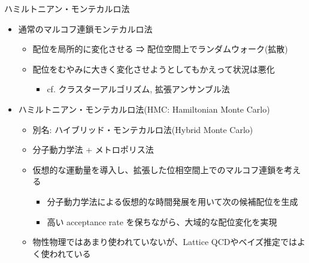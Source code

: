 
\begin{frame}[t,fragile]{ハミルトニアン・モンテカルロ法}
  \begin{itemize}
  \item 通常のマルコフ連鎖モンテカルロ法
  \begin{itemize}
    \item 配位を局所的に変化させる ⇒ 配位空間上でランダムウォーク(拡散)
    \item 配位をむやみに大きく変化させようとしてもかえって状況は悪化
    \begin{itemize}
      \item cf. クラスターアルゴリズム, 拡張アンサンブル法
    \end{itemize}
  \end{itemize}

  \item ハミルトニアン・モンテカルロ法(HMC: Hamiltonian Monte Carlo)
  \begin{itemize}
    \item 別名: ハイブリッド・モンテカルロ法(Hybrid Monte Carlo)
    \item 分子動力学法 + メトロポリス法
    \item 仮想的な運動量を導入し、拡張した位相空間上でのマルコフ連鎖を考える
    \begin{itemize}
      \item 分子動力学法による仮想的な時間発展を用いて次の候補配位を生成
      \item 高い acceptance rate を保ちながら、大域的な配位変化を実現
    \end{itemize}
    \item 物性物理ではあまり使われていないが、Lattice QCDやベイズ推定ではよく使われている
    \end{itemize}
\end{itemize}
\end{frame}

